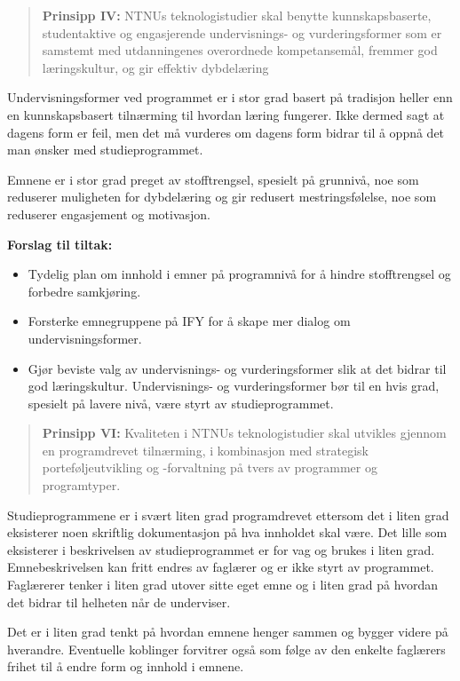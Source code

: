 \begin{quote}
	\textbf{Prinsipp IV:} NTNUs teknologistudier skal benytte kunnskapsbaserte, studentaktive og engasjerende undervisnings- og vurderingsformer som er samstemt med utdanningenes overordnede kompetansemål, fremmer god læringskultur, og gir effektiv dybdelæring
\end{quote}

Undervisningsformer ved programmet er i stor grad basert på tradisjon heller enn en kunnskapsbasert tilnærming til hvordan læring fungerer. Ikke dermed sagt at dagens form er feil, men det må vurderes om dagens form bidrar til å oppnå det man ønsker med studieprogrammet.

Emnene er i stor grad preget av stofftrengsel, spesielt på grunnivå, noe som reduserer muligheten for dybdelæring og gir redusert mestringsfølelse, noe som reduserer engasjement og motivasjon.

\textbf{Forslag til tiltak:}

\begin{itemize}
	\item Tydelig plan om innhold i emner på programnivå for å hindre stofftrengsel og forbedre samkjøring.
	\item Forsterke emnegruppene på IFY for å skape mer dialog om undervisningsformer.
	\item Gjør beviste valg av undervisnings- og vurderingsformer slik at det bidrar til god læringskultur. Undervisnings- og vurderingsformer bør til en hvis grad, spesielt på lavere nivå, være styrt av studieprogrammet.
\end{itemize}

\begin{quote}
	\textbf{Prinsipp VI:} Kvaliteten i NTNUs teknologistudier skal utvikles gjennom en programdrevet tilnærming, i kombinasjon med strategisk porteføljeutvikling og -forvaltning på tvers av programmer og programtyper.
\end{quote}

Studieprogrammene er i svært liten grad programdrevet ettersom det i liten grad eksisterer noen skriftlig dokumentasjon på hva innholdet skal være. Det lille som eksisterer i beskrivelsen av studieprogrammet er for vag og brukes i liten grad. Emnebeskrivelsen kan fritt endres av faglærer og er ikke styrt av programmet. Faglærerer tenker i liten grad utover sitte eget emne og i liten grad på hvordan det bidrar til helheten når de underviser.

Det er i liten grad tenkt på hvordan emnene henger sammen og bygger videre på hverandre. Eventuelle koblinger forvitrer også som følge av den enkelte faglærers frihet til å endre form og innhold i emnene.


